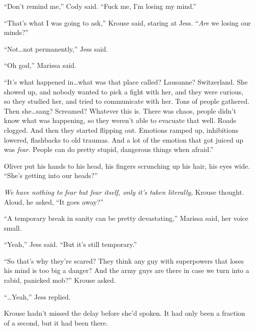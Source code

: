 ``Don't remind me,'' Cody said.  ``Fuck me, I'm losing my mind.''



``That's what I was going to ask,'' Krouse said, staring at Jess.  ``\emph{Are} we losing our minds?''



``Not\ldots not permanently,'' Jess said.



``Oh god,'' Marissa said.



``It's what happened in\ldots what was that place called?  Lausanne?  Switzerland.  She showed up, and nobody wanted to pick a fight with her, and they were curious, so they studied her, and tried to communicate with her.  Tons of people gathered.  Then she\ldots sang?  Screamed?  Whatever this is.  There was chaos, people didn't know what was happening, so they weren't able to evacuate that well.  Roads clogged.  And then they started flipping out.  Emotions ramped up, inhibitions lowered, flashbacks to old traumas.  And a lot of the emotion that got juiced up was \emph{fear}.  People can do pretty stupid, dangerous things when afraid.''



Oliver put his hands to his head, his fingers scrunching up his hair, his eyes wide.  ``She's getting into our heads?''



\emph{We have nothing to fear but fear itself, only it's taken literally, }Krouse thought.  Aloud, he asked, ``It goes away?''



``A temporary break in sanity can be pretty devastating,'' Marissa said, her voice small.



``Yeah,'' Jess said.  ``But it's still temporary.''



``So that's why they're scared?  They think any guy with superpowers that loses his mind is too big a danger?  And the army guys are there in case we turn into a rabid, panicked mob?''  Krouse asked.



``\ldots{}Yeah,'' Jess replied.



Krouse hadn't missed the delay before she'd spoken.  It had only been a fraction of a second, but it had been there.



